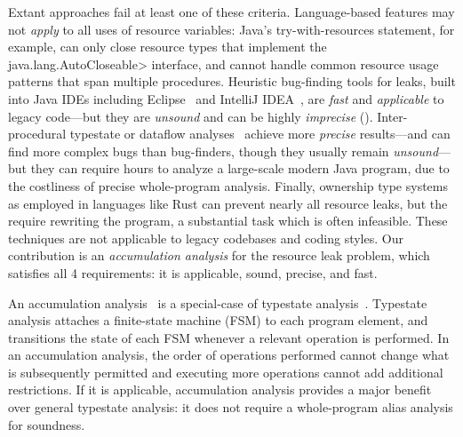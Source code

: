 Extant approaches fail at least one of these criteria.
Language-based features may not \emph{apply} to all uses of resource variables:
Java's try-with-resources statement, for example, can
only close resource types that implement the \<java.lang.AutoCloseable> interface,
and cannot handle
common resource usage patterns that span multiple procedures. 
Heuristic bug-finding tools for leaks, built into Java IDEs including
Eclipse~\cite{ecj-resource-leak} and IntelliJ
IDEA~\cite{idea-resource-leak}, 
are \emph{fast} and \emph{applicable} to legacy
code---but they are \emph{unsound} and can be highly \emph{imprecise}
().  
Inter-procedural typestate or dataflow analyses~\cite{TorlakC10,zuo2019grapple}
achieve more \emph{precise}
results---and
can find more complex bugs than bug-finders, though they usually remain
\emph{unsound}---but
they can require hours to analyze a large-scale modern Java program, due
to the costliness of precise whole-program analysis.    Finally, ownership type
systems~\cite{clarke2013ownership} as employed in languages like Rust
 can prevent nearly all resource leaks, but the require
rewriting the program, a substantial task which is often infeasible.
These techniques are not applicable to legacy codebases and coding styles.
Our contribution is an \emph{accumulation analysis} for the resource leak
problem, which satisfies all 4 requirements:  it is applicable,
sound, precise, and fast.

An accumulation analysis~\cite{KelloggRSSE2020}
is a special-case of typestate analysis~\cite{StromY86}.
Typestate analysis attaches a finite-state machine (FSM)
to each program element, and transitions the state of each
FSM whenever a relevant operation is performed.
In an accumulation analysis,
the order of operations performed cannot change what is subsequently
permitted and executing more operations cannot add additional
restrictions.  If it is applicable, accumulation analysis provides a major
benefit over general typestate analysis: it does not
require a whole-program alias analysis for soundness.



